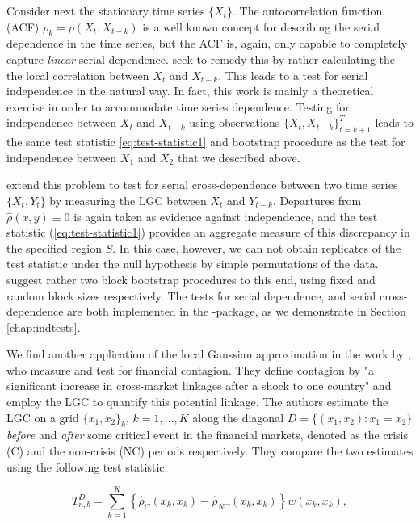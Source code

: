Consider next the stationary time series $\{X_t\}$. The autocorrelation function (ACF) $\rho_k = \rho(X_t, X_{t-k})$ is a well known concept for describing the serial dependence in the time series, but the ACF is, again, only capable to completely capture \emph{linear} serial dependence. \citet{laca:tjos:2017} seek to remedy this by rather calculating the the local correlation between $X_t$ and $X_{t-k}$. This leads to a test for serial independence in the natural way. In fact, this work is mainly a theoretical exercise in order to accommodate time series dependence. Testing for independence between $X_t$ and $X_{t-k}$ using observations $\{X_t, X_{t-k}\}_{t = k+1}^T$ leads to the same test statistic \eqref{eq:test-statistic1} and bootstrap procedure as the test for independence between $X_1$ and $X_2$ that we described above. 

\citet{laca:tjos:2018} extend this problem to test for serial cross-dependence between two time series $\{X_t, Y_t\}$ by measuring the LGC between $X_t$ and $Y_{t-k}$. Departures from $\widehat\rho(x,y) \equiv 0$ is again taken as evidence against independence, and the test statistic (\ref{eq:test-statistic1}) provides an aggregate measure of this discrepancy in the specified region $S$. In this case, however, we can not obtain replicates of the test statistic under the null hypothesis by simple permutations of the data. \citet{laca:tjos:2018} suggest rather two block bootstrap procedures to this end, using fixed and random block sizes respectively. The tests for serial dependence, and serial cross-dependence are both implemented in the -package, as we demonstrate in Section \ref{chap:indtests}.

We find another application of the local Gaussian approximation in the work by \citet{stov:tjos:huft:2014}, who measure and test for financial contagion. They define contagion by "a significant increase in cross-market linkages after a shock to one country" \citep[p. 2223]{forb:rigo:2002} and employ the LGC to quantify this potential linkage. The authors estimate the LGC on a grid $\{x_1, x_2\}_k$, $k=1,\ldots,K$ along the diagonal $D=\{(x_1,x_2): x_1 = x_2\}$ \emph{before} and \emph{after} some critical event in the financial markets, denoted as the crisis (C) and the non-crisis (NC) periods respectively. They compare the two estimates using the following test statistic; 

$$T_{n,b}^D = \sum_{k=1}^K \left\{\widehat\rho_C(x_k, x_k) - \widehat\rho_{NC}(x_k, x_k) \right\}w(x_k,x_k),$$

